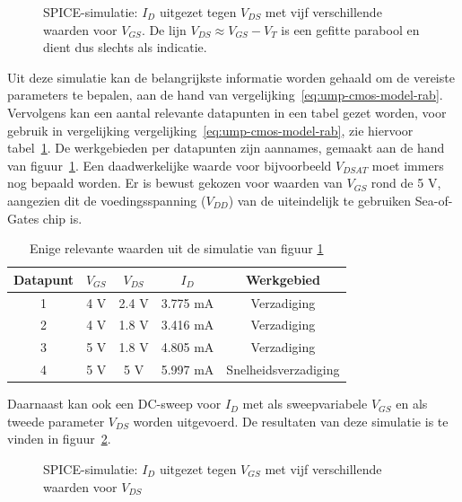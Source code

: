 \documentclass{article}
\begin{document}
\begin{figure}[H]
	\centering
	\setlength{} 
	\setlength{}
	
	\caption{SPICE-simulatie: $I_{D}$ uitgezet tegen $V_{DS}$ met vijf verschillende waarden voor $V_{GS}$. De lijn $V_{DS} \approx V_{GS} - V_{T}$ is een gefitte parabool en dient dus slechts als indicatie.}
	\label{fig:ump-sim-fig-vds}
\end{figure}

Uit deze simulatie kan de belangrijkste informatie worden gehaald om de vereiste parameters te bepalen, aan de hand van vergelijking~\ref{eq:ump-cmos-model-rab}. Vervolgens kan een aantal relevante datapunten in een tabel gezet worden, voor gebruik in vergelijking vergelijking~\ref{eq:ump-cmos-model-rab}, zie hiervoor tabel~\ref{tab:ump-sim-tab-vds}. De werkgebieden per datapunten zijn aannames, gemaakt aan de hand van figuur~\ref{fig:ump-sim-fig-vds}. Een daadwerkelijke waarde voor bijvoorbeeld $V_{DSAT}$ moet immers nog bepaald worden. Er is bewust gekozen voor waarden van $V_{GS}$ rond de 5 V, aangezien dit de voedingsspanning ($V_{DD}$) van de uiteindelijk te gebruiken Sea-of-Gates chip is.

\begin{table}[h]
	\centering
	\caption{Enige relevante waarden uit de simulatie van figuur \ref{fig:ump-sim-fig-vds}}
	\label{tab:ump-sim-tab-vds}
	\begin{tabular}{|c|c|c|c|c|} 	
		\hline
		Datapunt & $V_{GS}$ & $V_{DS}$ & $I_{D}$ & Werkgebied \\
		\hline
		1 & 4 V & 2.4 V & 3.775 mA & Verzadiging \\
		\hline
		2 & 4 V & 1.8 V & 3.416 mA & Verzadiging \\
		\hline
		3 & 5 V & 1.8 V & 4.805 mA & Verzadiging \\
		\hline
		4 & 5 V & 5 V & 5.997 mA & Snelheidsverzadiging \\
		\hline	
	\end{tabular}
\end{table}

Daarnaast kan ook een DC-sweep voor $I_{D}$ met als sweepvariabele $V_{GS}$ en als tweede parameter $V_{DS}$ worden uitgevoerd. De resultaten van deze simulatie is te vinden in figuur~\ref{fig:ump-sim-fig-vgs}.

\begin{figure}[H]
	\centering
	\setlength{} 
	\setlength{}
	
	\caption{SPICE-simulatie: $I_{D}$ uitgezet tegen $V_{GS}$ met vijf verschillende waarden voor $V_{DS}$}
	\label{fig:ump-sim-fig-vgs}
\end{figure}
\end{document}
